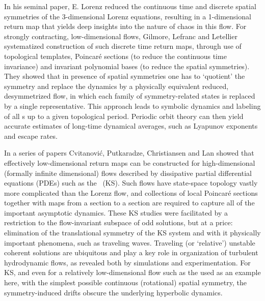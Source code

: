 
In his seminal paper, E. Lorenz reduced the
continuous time and discrete spatial symmetries of the
3-dimensional Lorenz equations, resulting in a 1-dimensional
return map that yields deep insights into the
nature of chaos in this flow. For strongly contracting,
low-dimensional flows, Gilmore, Lefranc and
Letellier systematized construction
of such discrete time return maps, through use of topological
templates, Poincar\'e sections (to reduce the continuous time
invariance) and invariant polynomial bases (to reduce the
spatial symmetries). They showed that in presence of spatial
symmetries one has to  `quotient' the symmetry and replace
the dynamics by a physically equivalent reduced,
desymmetrized flow, in which each family of symmetry-related
states is replaced by a single representative. This approach
leads to symbolic dynamics and labeling of all \po s up to a
given topological period. Periodic orbit theory can then
yield accurate estimates of long-time dynamical averages,
such as Lyapunov exponents and escape rates.

In a series of papers Cvitanovi\'{c}, Putkaradze,
Christiansen and Lan%
showed that effectively low-dimensional return maps can be
constructed for high-dimensional (formally infinite
dimensional)  flows described by dissipative partial
differential equations (PDEs) such as the \KSe\ (KS). Such
flows have state-space topology vastly more complicated than
the Lorenz flow, and collections of local Poincar\'e sections
together with maps from a section to a section are required
to capture all of the important asymptotic dynamics. These KS
studies were facilitated by a restriction to the
flow-invariant subspace of odd solutions, but at a price:
elimination of the translational symmetry of the KS system
and with it physically important phenomena, such as traveling
waves. Traveling (or `relative') unstable coherent solutions
are ubiquitous and play a key role in organization of
turbulent hydrodynamic flows, as revealed both by
simulations and
experimentation.
For KS, and even for a relatively
low-dimensional flow such as the
\cLe{} used as an example here, with
the simplest possible continuous (rotational) spatial
symmetry, the symmetry-induced drifts obscure the underlying
hyperbolic dynamics.

